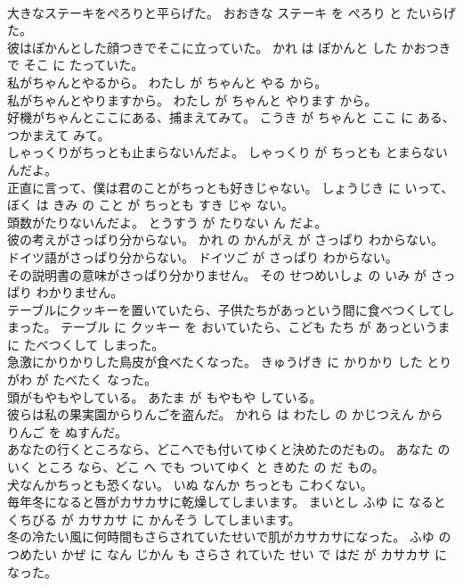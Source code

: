 \documentclass[8pt]{extreport}
\begin{document}
\begin{CJK}{UTF8}{min}
\\	大きなステーキをぺろりと平らげた。	おおきな ステーキ を ぺろり と たいらげた。	
\\	彼はぽかんとした顔つきでそこに立っていた。	かれ は ぽかんと した かおつき で そこ に たっていた。	
\\	私がちゃんとやるから。	わたし が ちゃんと やる から。	
\\	私がちゃんとやりますから。	わたし が ちゃんと やります から。	
\\	好機がちゃんとここにある、捕まえてみて。	こうき が ちゃんと ここ に ある、つかまえて みて。	
\\	しゃっくりがちっとも止まらないんだよ。	しゃっくり が ちっとも とまらない んだよ。	
\\	正直に言って、僕は君のことがちっとも好きじゃない。	しょうじき に いって、ぼく は きみ の こと が ちっとも すき じゃ ない。	
\\	頭数がたりないんだよ。	とうすう が たりない ん だよ。	
\\	彼の考えがさっぱり分からない。	かれ の かんがえ が さっぱり わからない。	
\\	ドイツ語がさっぱり分からない。	ドイツご が さっぱり わからない。	
\\	その説明書の意味がさっぱり分かりません。	その せつめいしょ の いみ が さっぱり わかりません。	
\\	テーブルにクッキーを置いていたら、子供たちがあっという間に食べつくしてしまった。	テーブル に クッキー を おいていたら、こども たち が あっというまに たべつくして しまった。	
\\	急激にかりかりした鳥皮が食べたくなった。	きゅうげき に かりかり した とりがわ が たべたく なった。	
\\	頭がもやもやしている。	あたま が もやもや している。	
\\	彼らは私の果実園からりんごを盗んだ。	かれら は わたし の かじつえん から りんご を ぬすんだ。	
\\	あなたの行くところなら、どこへでも付いてゆくと決めたのだもの。	あなた の いく ところ なら、どこ へ でも ついてゆく と きめた の だ もの。	
\\	犬なんかちっとも恐くない。	いぬ なんか ちっとも こわくない。	
\\	毎年冬になると唇がカサカサに乾燥してしまいます。	まいとし ふゆ に なると くちびる が カサカサ に かんそう してしまいます。	
\\	冬の冷たい風に何時間もさらされていたせいで肌がカサカサになった。	ふゆ の つめたい かぜ に なん じかん も さらさ れていた せい で はだ が カサカサ に なった。	

\end{CJK}
\end{document}
